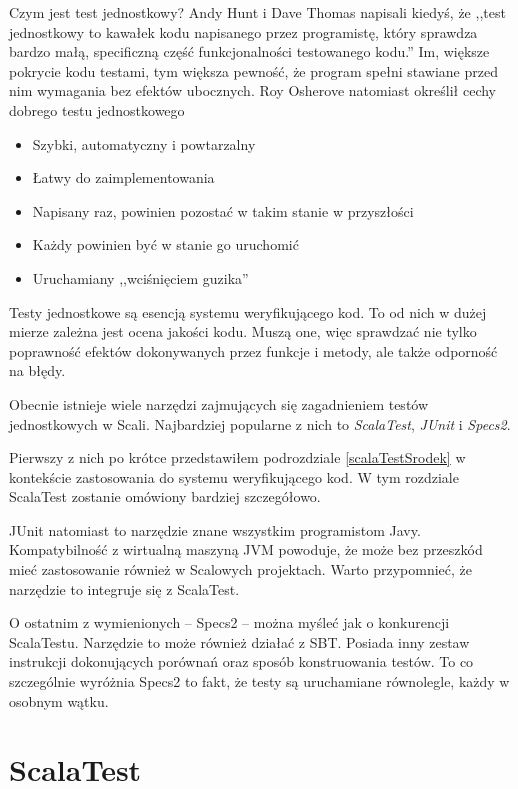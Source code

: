 \documentclass[brudnopis]{xmgr}
\begin{document}
Czym jest test jednostkowy? Andy Hunt i Dave Thomas napisali kiedyś, że ,,test jednostkowy to kawałek kodu napisanego przez programistę, który sprawdza bardzo małą, specificzną część funkcjonalności testowanego kodu.''\cite[s.3]{Hunt:2003:PUT} Im, większe pokrycie kodu testami, tym większa pewność, że program spełni stawiane przed nim wymagania bez efektów ubocznych. Roy Osherove natomiast określił cechy dobrego testu jednostkowego\cite[s. 6]{Osherove:2009:TAOUT} 

\begin{itemize}
\item Szybki, automatyczny i powtarzalny
\item Łatwy do zaimplementowania
\item Napisany raz, powinien pozostać w takim stanie w przyszłości
\item Każdy powinien być w stanie go uruchomić
\item Uruchamiany ,,wciśnięciem guzika'' 
\end{itemize}

Testy jednostkowe są esencją systemu weryfikującego kod. To od nich w dużej mierze zależna jest ocena jakości kodu. Muszą one, więc sprawdzać nie tylko poprawność efektów dokonywanych przez funkcje i metody, ale także odporność na błędy.  

Obecnie istnieje wiele narzędzi zajmujących się zagadnieniem testów jednostkowych w Scali. Najbardziej popularne z nich to \emph{ScalaTest}, \emph{JUnit} i \emph{Specs2}.

Pierwszy z nich po krótce przedstawiłem podrozdziale \ref{scalaTestSrodek} w kontekście zastosowania do systemu weryfikującego kod. W tym rozdziale ScalaTest zostanie omówiony bardziej szczegółowo. 

JUnit natomiast to narzędzie znane wszystkim programistom Javy. Kompatybilność z wirtualną maszyną JVM powoduje, że może bez przeszkód mieć zastosowanie również w Scalowych projektach. Warto przypomnieć, że narzędzie to integruje się z ScalaTest. 

O ostatnim z wymienionych -- Specs2 -- można myśleć jak o konkurencji ScalaTestu. Narzędzie to może również działać z SBT. Posiada inny zestaw instrukcji dokonujących porównań oraz sposób konstruowania testów. To co szczególnie wyróżnia Specs2 to fakt, że testy są uruchamiane równolegle, każdy w osobnym wątku.
      
\section{ScalaTest}
\end{document}
